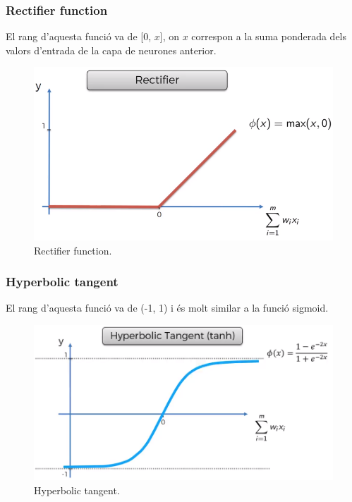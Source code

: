 \documentclass[12pt]{article}
\begin{document}
\subsubsection{Rectifier function}
El rang d'aquesta funció va de [0, $x$], on $x$ correspon a la suma ponderada dels valors d'entrada de la capa de neurones anterior.
\begin{figure}[h!]
	\centering
	\includegraphics[scale=0.3]{imatges/fa/3rectifier.png}
	\caption{Rectifier function.}
\end{figure}

\subsubsection{Hyperbolic tangent}
El rang d'aquesta funció va de (-1, 1) i és molt similar a la funció sigmoid.
\begin{figure}[h!]
	\centering
	\includegraphics[scale=0.3]{imatges/fa/4tanh.png}
	\caption{Hyperbolic tangent.}
\end{figure}
\end{document}

